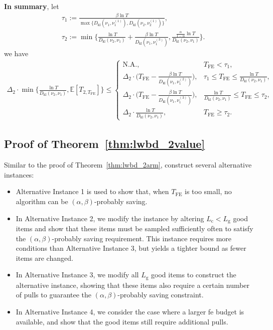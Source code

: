 \documentclass[twoside,11pt]{article}
\newcommand{\kl}{D_{\mathrm{kl}}}
\newcommand{\rmc}{\mathrm{c}}
\newcommand{\rmg}{\mathrm{g}}
\newcommand{\bbE}{\mathbb{E}}
\newcommand{\Tfe}{T_{\mathrm{FE}}}
\begin{document}
\newline
\textbf{In summary}, 
let 
\begin{align}\label{equ:lwbd_tau_two_item}
    &\tau_1:=\frac{\beta\ln T}{ \max\big\{\kl(\nu_1,\nu_1^{(1)}),\kl(\nu_2,\nu_2^{(1)})\big\}},
    \\
    &
    \tau_2:=\min\bigg\{\frac{\ln T}{\kl(\nu_2,\nu_1)}+\frac{\beta\ln T}{\kl(\nu_1,\nu_1^{(3)})},\frac{\frac{\alpha}{1-\alpha} \ln T}{\kl(\nu_2,\nu_1)}\bigg\}.
\end{align}
we have
\begin{align}
    \Delta_2\cdot\min\bigg\{\frac{\ln T}{\kl(\nu_2,\nu_1)},\bbE[T_{2,\Tfe}]\bigg\}
    \leq
    \begin{cases}
        \mbox{N.A.},& \Tfe < \tau_1,
        \\
        \Delta_2\cdot \big(\Tfe-\frac{\beta \ln T}{\kl(\nu_1,\nu_1^{(2)})}\big),& \tau_1\leq \Tfe\leq \frac{\ln T}{\kl(\nu_2,\nu_1)},
        \\
        \Delta_2\cdot \big(\Tfe-\frac{\beta \ln T}{\kl(\nu_1,\nu_1^{(3)})}\big),& \frac{\ln T}{\kl(\nu_2,\nu_1)}\leq \Tfe\leq \tau_2,
        \\
        \Delta_2\cdot \frac{\ln T}{\kl(\nu_2,\nu_1)},& \Tfe\geq \tau_2.
    \end{cases}
\end{align}

\subsection{Proof of Theorem~\ref{thm:lwbd_2value}}\label{app:proof_lwbd_2value}
Similar to the proof of Theorem~\ref{thm:lwbd_2arm}, construct several alternative instances:
\begin{itemize}[leftmargin=1em,parsep=1pt,topsep=1pt]
    \item Alternative Instance 1 is used to show that, when $\Tfe$ is too small, no algorithm can be $(\alpha,\beta)$-probably saving.
    \item In Alternative Instance 2, we modify the instance by altering $L_{\rmc}<L_{\rmg}$ good items and show that these items must be sampled sufficiently often to satisfy the $(\alpha,\beta)$-probably saving requirement. This instance requires more conditions than Alternative Instance 3, but yields a tighter bound as fewer items are changed.
    \item In Alternative Instance 3, we modify all $L_{\rmg}$ good items to construct the alternative instance, showing that these items also require a certain number of pulls to guarantee the $(\alpha,\beta)$-probably saving constraint.
    \item In Alternative Instance 4, we consider the case where a larger \ac{fe} budget is available, and show that the good items still require additional pulls.
\end{itemize}
\end{document}
